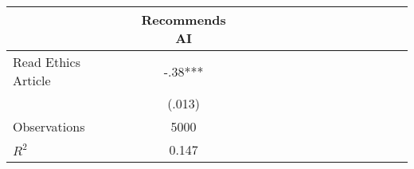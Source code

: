 \begin{tabular}{l*{14}{c}}
                    &\multicolumn{1}{c}{Recommends AI}\\
\hline
Read Ethics Article &        -.38***\\
                    &      (.013)   \\
\hline
Observations        &        5000   \\
\(R^{2}\)           &       0.147   \\
\end{tabular}
